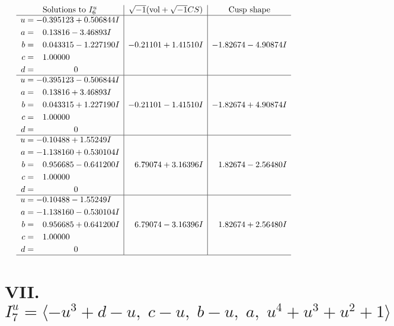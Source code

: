 \documentclass[1p]{elsarticle_modified}
\theoremstyle{definition}
\newcommand{\I}{\sqrt{-1}}
\begin{document}
$$\begin{array}{c|c|c}  
\text{Solutions to }I^u_{6}& \I (\text{vol} + \sqrt{-1}CS) & \text{Cusp shape}\\
 \hline 
\begin{aligned}
u &= -0.395123 + 0.506844 I \\
a &= \phantom{-}0.13816 - 3.46893 I \\
b &= \phantom{-}0.043315 - 1.227190 I \\
c &= \phantom{-}1.00000\phantom{ +0.000000I} \\
d &= \phantom{-0.000000 } 0\end{aligned}
 & -0.21101 + 1.41510 I & -1.82674 - 4.90874 I \\ \hline\begin{aligned}
u &= -0.395123 - 0.506844 I \\
a &= \phantom{-}0.13816 + 3.46893 I \\
b &= \phantom{-}0.043315 + 1.227190 I \\
c &= \phantom{-}1.00000\phantom{ +0.000000I} \\
d &= \phantom{-0.000000 } 0\end{aligned}
 & -0.21101 - 1.41510 I & -1.82674 + 4.90874 I \\ \hline\begin{aligned}
u &= -0.10488 + 1.55249 I \\
a &= -1.138160 + 0.530104 I \\
b &= \phantom{-}0.956685 - 0.641200 I \\
c &= \phantom{-}1.00000\phantom{ +0.000000I} \\
d &= \phantom{-0.000000 } 0\end{aligned}
 & \phantom{-}6.79074 + 3.16396 I & \phantom{-}1.82674 - 2.56480 I \\ \hline\begin{aligned}
u &= -0.10488 - 1.55249 I \\
a &= -1.138160 - 0.530104 I \\
b &= \phantom{-}0.956685 + 0.641200 I \\
c &= \phantom{-}1.00000\phantom{ +0.000000I} \\
d &= \phantom{-0.000000 } 0\end{aligned}
 & \phantom{-}6.79074 - 3.16396 I & \phantom{-}1.82674 + 2.56480 I\\
 \hline 
 \end{array}$$\newpage\newpage\renewcommand{\arraystretch}{1}
\centering \section*{VII. $I^u_{7}= \langle - u^3+d- u,\;c- u,\;b- u,\;a,\;u^4+u^3+u^2+1 \rangle$}
\end{document}
